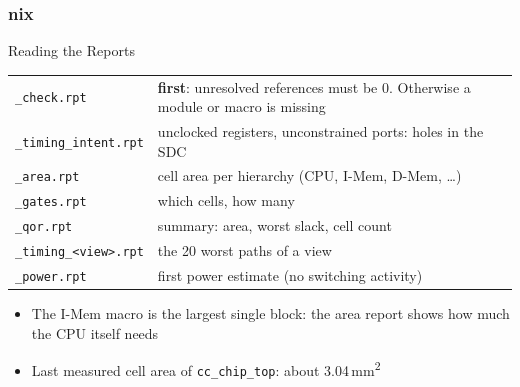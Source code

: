 \documentclass{beamer}
\newcommand{\astitle}{nix}
\newcommand{\assubtitle}{nix}
\newcommand{\cmd}[1]{\texttt{#1}}
\begin{document}
\renewcommand{\assubtitle}{Reading the Reports}
\begin{frame}
\frametitle{\astitle}
\begin{block}{\assubtitle}
  \footnotesize
  \begin{tabularx}{\linewidth}{@{}lY@{}}
    \cmd{\_check.rpt}          & \textbf{first}: unresolved references must be 0.
                                 Otherwise a module or macro is missing\\[2pt]
    \cmd{\_timing\_intent.rpt} & unclocked registers, unconstrained ports:
                                 holes in the SDC\\[2pt]
    \cmd{\_area.rpt}           & cell area per hierarchy (CPU, I-Mem, D-Mem, \dots)\\[2pt]
    \cmd{\_gates.rpt}          & which cells, how many\\[2pt]
    \cmd{\_qor.rpt}            & summary: area, worst slack, cell count\\[2pt]
    \cmd{\_timing\_<view>.rpt} & the 20 worst paths of a view\\[2pt]
    \cmd{\_power.rpt}          & first power estimate (no switching activity)\\
  \end{tabularx}
  \vspace{4pt}
  \begin{itemize}
    \item The I-Mem macro is the largest single block: the area report shows
      how much the CPU itself needs
    \item Last measured cell area of \cmd{cc\_chip\_top}: about 3.04\,mm\textsuperscript{2}
  \end{itemize}
\end{block}
\end{frame}
\end{document}
